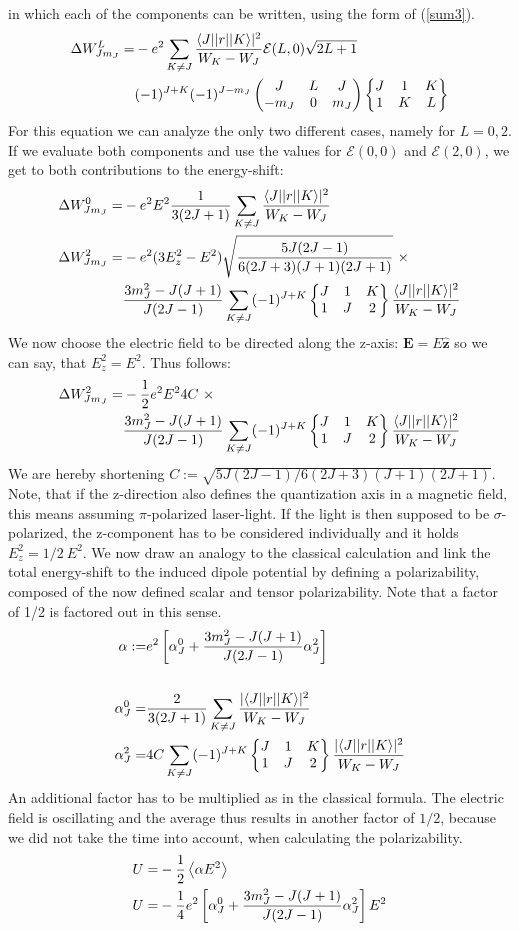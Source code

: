 in which each of the components can be written, using the form of (\ref{sum3}).
\begin{align}
\Delta W^L_{Jm_J}=&-e^2\sum_{K\neq J}\frac{\langle J| |r| | K\rangle|^2}{W_K-W_J}\mathcal{E}(L,0)\sqrt{2L+1}\notag\\&(-1)^{J+K} (-1)^{J-m_J}\begin{pmatrix}J&L&J\\-m_J&0&m_J\end{pmatrix}\begin{Bmatrix}J&1&K\\1&K&L\end{Bmatrix}\label{pertub4}
\end{align}
For this equation we can analyze the only two different cases, namely for $L=0,2$. If we evaluate both components and use the values for $\mathcal{E}(0,0)$ and $\mathcal{E}(2,0)$, we get to both contributions to the energy-shift:
\begin{align}
\Delta W^0_{Jm_J}=&-e^2E^2\frac{1}{3(2J+1)}\sum_{K\neq J}\frac{\braopket{J}{|r|}{K}|^2}{W_K-W_J}\\
\Delta W^2_{Jm_J}=&-e^2(3E^2_z-E^2)\sqrt{\frac{5J(2J-1)}{6(2J+3)(J+1)(2J+1)}}\ \times\notag\\
&\frac{3m^2_J-J(J+1)}{J(2J-1)}\sum_{K\neq J}(-1)^{J+K}\sixj{J}{1}{K}{1}{J}{2}\frac{\braopket{J}{|r|}{K}|^2}{W_K-W_J}
\end{align}
We now choose the electric field to be directed along the z-axis: $\boldsymbol{E}=E\hat{\boldsymbol{z}}$ so we can say, that $E^2_z=E^2$. Thus follows:
\begin{align}
\Delta W^2_{Jm_J}=&-\frac{1}{2}e^2E^24C\ \times\notag\\
&\frac{3m^2_J-J(J+1)}{J(2J-1)}\sum_{K\neq J}(-1)^{J+K}\begin{Bmatrix}J&1&K\\1&J&2\end{Bmatrix}\frac{\langle J| |r| | K\rangle|^2}{W_K-W_J}\label{alpha21}
\end{align}
We are hereby shortening $C:=\sqrt{5J(2J-1)/6(2J+3)(J+1)(2J+1)}$.
Note, that if the z-direction also defines the quantization axis in a magnetic field, this means assuming $\pi$-polarized laser-light. If the light is then supposed to be $\sigma$-polarized, the z-component has to be considered individually and it holds $E^2_z=1/2\ E^2$.
We now draw an analogy to the classical calculation and link the total energy-shift to the induced dipole potential by defining a polarizability, composed of the now defined scalar and tensor polarizability. Note that a factor of 1/2 is factored out in this sense.
\begin{align}
\alpha:=&e^2\left[\alpha^0_J+\frac{3m^2_J-J(J+1)}{J(2J-1)}\alpha^2_J\right]\\
\notag\\
\alpha^0_J=&\frac{2}{3(2J+1)}\sum_{K\neq J}\frac{|\langle J| |r| | K\rangle|^2}{W_K-W_J}\\
\alpha^2_J=&4C\sum_{K\neq J}(-1)^{J+K}\begin{Bmatrix}J&1&K\\1&J&2\end{Bmatrix}\frac{|\langle J| |r| | K\rangle|^2}{W_K-W_J}
\end{align}
An additional factor has to be multiplied as in the classical formula. The electric field is oscillating and the average thus results in another factor of $1/2$, because we did not take the time into account, when calculating the polarizability. 
\begin{align}
U=&-\frac{1}{2}\left\langle \alpha E^2\right\rangle\notag\\
U=&-\frac{1}{4}e^2\left[\alpha^0_J+\frac{3m^2_J-J(J+1)}{J(2J-1)}\alpha^2_J\right]E^2\label{shift}
\end{align}


